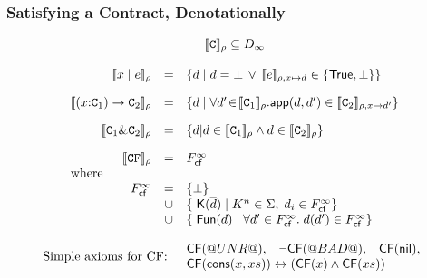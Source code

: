 \documentclass[serif,professionalfont]{beamer}
\begin{document}
\begin{frame}
  \frametitle{Satisfying a Contract, Denotationally}

    \[\begin{array}{rcl}
    \multicolumn{3}{c}{
      {\dbrace{\Ct}_{\rho} \subseteq D_{\infty}}
    }
    \\ \\
    \dbrace{x \mid e}_\rho
      & =  & \{ d \mid \unroll{d} = \bot \, \lor \, \unroll{\dbrace{e}_{\rho,x \mapsto d}}
                    \in \{ \ret{\injKZ{True} , \bot} \} \}
    \\[1em]
    \dbrace{(x{:}\Ct_1) \to \Ct_2}_{\rho}
     & = & \{ d \mid
               \forall d' \!\in\! \dbrace{\Ct_1}_\rho.
               \dapp(d,d') \in \dbrace{\Ct_2}_{\rho,x \mapsto d'}
               \}
    \\[1em]
    \dbrace{\Ct_1 \& \Ct_2}_\rho
     & = & \{ d | d \in \dbrace{\Ct_1}_\rho \land d \in \dbrace{\Ct_2}_\rho \}
    \\[1em]
    \dbrace{\CF}_\rho & = &  \Fcf^{\infty}  \\
    \multicolumn{3}{l}{\text{where}} \\
       F_{\lcfZ}^{\infty} & = & \{ \bot \} \\
                       & \cup & \{\;\injK{K}{\ol{d}} \mid K^n \in \Sigma,\; d_i \in F_{\lcfZ}^{\infty} \} \\
                       & \cup & \{\;\injFun{d} \mid \forall d' \in F_{\lcfZ}^{\infty}.\; d(d') \in F_{\lcfZ}^{\infty} \}
    \end{array}\]

    \pause

    \[
    \begin{array}{lr}
      \text{Simple axioms for CF:}
      &
      \begin{array}{lll}
      \cf(\unr), & \neg \cf(\bad), & \cf(\nil),   \\
      \multicolumn{3}{l}{\cf(\cons{x}{xs}) \leftrightarrow (\cf(x) \land \cf(xs))}
      \end{array}
    \end{array}
    \]

\end{frame}
\end{document}
